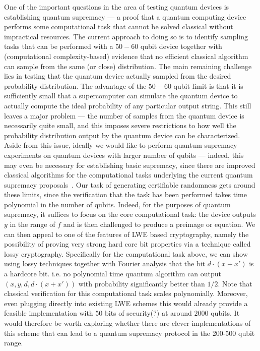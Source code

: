 \documentclass[11pt]{article}
\theoremstyle{remark}
\theoremstyle{definition}
\begin{document}
One of the important questions in the area of testing quantum devices is establishing quantum supremacy --- a proof that a quantum computing device performs some 
computational task that cannot be solved classical without impractical resources. The current approach to doing so is to identify sampling tasks that can be performed with
a $50-60$ qubit device together with (computational complexity-based) evidence that no efficient classical algorithm can sample from the same (or close) distribution. %
The main remaining challenge lies in testing that the quantum device actually sampled from the desired probability distribution. The advantage of the $50-60$ qubit limit is that it is sufficiently small that a supercomputer can simulate the quantum device to actually compute the ideal probability of any particular output string. This still leaves a major problem --- the number of samples from the quantum device is necessarily quite small, and this imposes severe restrictions to how well the probability distribution output by the quantum device can be characterized. Aside from this issue,
ideally we would like to perform quantum supremacy experiments on quantum devices with larger number of qubits --- indeed, 
this may even be necessary for establishing basic supremacy, since there are improved classical algorithms for the computational tasks underlying the current quantum supremacy proposals~\cite{}. Our task of generating certifiable randomness gets around these limits, since the verification that the task has been performed takes time polynomial in the number of qubits. Indeed, for the purposes of quantum supremacy, it suffices to focus on the core computational task: the device outputs $y$ in the range of $f$ and is then challenged to produce a preimage 
or equation. We can then appeal to one of the features of LWE based cryptography, namely the possibility of proving very strong hard core bit properties via a technique called lossy cryptography. Specifically for the computational task above, we can show using lossy techniques together with Fourier analysis that the bit $d\cdot(x + x')$ is a hardcore bit. i.e. no polynomial time quantum algorithm 
can output $(x, y, d, d\cdot(x + x'))$ with probability significantly better than $1/2$. Note that classical verification for this computational task
scales polynomially. Moreover, even plugging directly into existing LWE schemes this would already provide a feasible implementation with $50$ bits of security(?) at around $2000$ qubits. It would therefore be worth exploring whether there are clever implementations of this scheme 
that can lead to a quantum supremacy protocol in the 200-500 qubit range. 
\end{document}
